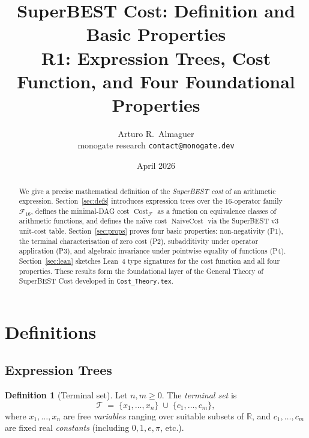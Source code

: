 \documentclass[12pt,a4paper]{article}
\title{SuperBEST Cost: Definition and Basic Properties\\[6pt]
       \large R1: Expression Trees, Cost Function, and Four Foundational Properties}
\author{Arturo R.\ Almaguer\\
\small monogate research \quad \texttt{contact@monogate.dev}}
\date{April 2026}
\theoremstyle{definition}
\newtheorem{definition}[theorem]{Definition}
\newcommand{\Cost}{\operatorname{Cost}}
\newcommand{\NC}{\operatorname{NaiveCost}}
\newcommand{\Fam}{\mathcal{F}}
\begin{document}
\maketitle

\begin{abstract}
We give a precise mathematical definition of the \emph{SuperBEST cost} of an
arithmetic expression.  Section~\ref{sec:defs} introduces expression trees over
the 16-operator family $\Fam_{16}$, defines the minimal-DAG cost $\Cost_{\Fam}$
as a function on equivalence classes of arithmetic functions, and defines the
na\"{i}ve cost $\NC$ via the SuperBEST v3 unit-cost table.
Section~\ref{sec:props} proves four basic properties: non-negativity (P1),
the terminal characterisation of zero cost (P2), subadditivity under operator
application (P3), and algebraic invariance under pointwise equality of functions
(P4).  Section~\ref{sec:lean} sketches Lean~4 type signatures for the cost
function and all four properties.  These results form the foundational layer of
the General Theory of SuperBEST Cost developed in \texttt{Cost\_Theory.tex}.
\end{abstract}

\tableofcontents
\bigskip

\section{Definitions}
\label{sec:defs}

\subsection{Expression Trees}

\begin{definition}[Terminal set]
\label{def:terminals}
Let $n, m \geq 0$.  The \emph{terminal set} is
\[
  \mathcal{T}
  \;=\;
  \{x_1,\ldots,x_n\}
  \;\cup\;
  \{c_1,\ldots,c_m\},
\]
where $x_1,\ldots,x_n$ are free \emph{variables} ranging over suitable subsets
of $\mathbb{R}$, and $c_1,\ldots,c_m$ are fixed real \emph{constants} (including
$0, 1, e, \pi$, etc.).
\end{definition}
\end{document}
